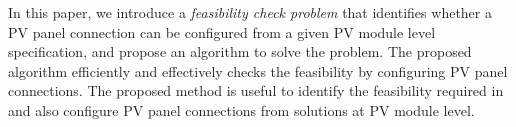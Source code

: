 \documentclass[conference]{IEEEtran}
\begin{document}
In this paper, we introduce a \textit{feasibility check problem} that identifies whether a PV panel connection can be configured from a given PV module level specification, and propose an algorithm to solve the problem. The proposed algorithm efficiently and effectively checks the feasibility by configuring PV panel connections. 
The proposed method is useful to 
identify the feasibility required in \cite{orozco2016optimized} and also 
configure PV panel connections from solutions at PV module level.



\end{document}
